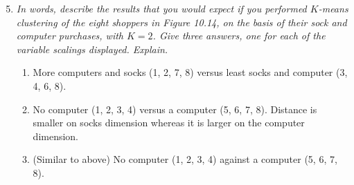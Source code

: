 \documentclass[11pt]{article}\usepackage[]{graphicx}\usepackage[]{color}
\begin{document}
\begin{enumerate}
        \setcounter{enumi}{4}
		
		\item \textit{In words, describe the results that you would expect if you performed $K$-means clustering of the eight shoppers in Figure 10.14, on the basis of their sock and computer purchases, with $K = 2$. Give three answers, one for each of the variable scalings displayed. Explain.}
		
		\begin{enumerate}
			\item More computers and socks (1, 2, 7, 8) versus least socks and computer (3, 4, 6, 8).
			\item No computer (1, 2, 3, 4) versus a computer (5, 6, 7, 8). Distance is smaller on socks dimension whereas it is larger on the computer dimension. 
			
			\item (Similar to above) No computer (1, 2, 3, 4) against a computer (5, 6, 7, 8).
			
		\end{enumerate}
		
    \end{enumerate}
\end{document}
